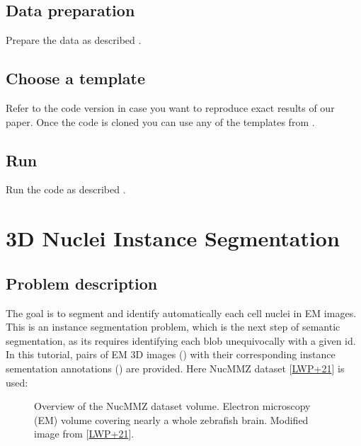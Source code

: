 \documentclass[letterpaper,10pt,english]{sphinxmanual}
\begin{document}
\subsection{Data preparation}
\label{\detokenize{tutorials/mitochondria:data-preparation}}
Prepare the data as described .


\subsection{Choose a template}
\label{\detokenize{tutorials/mitochondria:choose-a-template}}
Refer to the code version  in case you want to reproduce exact results of our paper. Once the code is cloned you can use any of the templates from .


\subsection{Run}
\label{\detokenize{tutorials/mitochondria:run}}
Run the code as described .


\section{3D Nuclei Instance Segmentation}
\label{\detokenize{tutorials/nucleus:d-nuclei-instance-segmentation}}\label{\detokenize{tutorials/nucleus:nucleus-tutorial}}\label{\detokenize{tutorials/nucleus::doc}}

\subsection{Problem description}
\label{\detokenize{tutorials/nucleus:problem-description}}
The goal is to segment and identify automatically each cell nuclei in EM images.
This is an instance segmentation problem, which is the next step of semantic
segmentation, as its requires identifying each blob unequivocally with a given
id. In this tutorial, pairs of EM 3D images () with their corresponding instance
sementation annotations () are provided. Here NucMM\sphinxhyphen{}Z dataset {[}\hyperlink{cite.bibliography:id2}{LWP+21}{]}
is used:

\begin{figure}[htbp]
\centering
\capstart

\noindent{}
\caption{Overview of the NucMM\sphinxhyphen{}Z dataset volume. Electron microscopy (EM) volume
covering nearly a whole zebrafish brain. Modified image from {[}\hyperlink{cite.bibliography:id2}{LWP+21}{]}.}\label{\detokenize{tutorials/nucleus:id4}}\end{figure}
\end{document}
